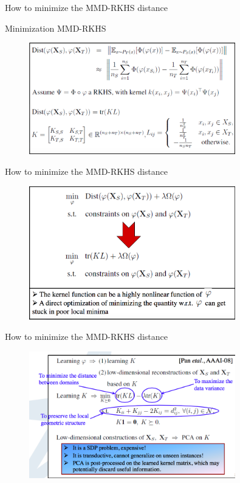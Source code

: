 \documentclass{beamer}
\begin{document}
\begin{frame}
{How to minimize the MMD-RKHS distance}
\begin{block}
{Minimization MMD-RKHS}

\end{block}
\begin{figure}
\centering
\includegraphics[width=0.8\textwidth]{figs/m1.png}
\end{figure}
\textcite{pan2008transfer}
\end{frame}
\begin{frame}
{How to minimize the MMD-RKHS distance}
\begin{figure}
\centering
\includegraphics[width=0.8\textwidth]{figs/m11.png}
\end{figure}
\textcite{pan2008transfer}
\end{frame}
\begin{frame}
{How to minimize the MMD-RKHS distance}
\begin{figure}
\centering
\includegraphics[width=0.8\textwidth]{figs/tca.png}
\end{figure}
\textcite{pan2011domain}
\end{frame}
\end{document}
